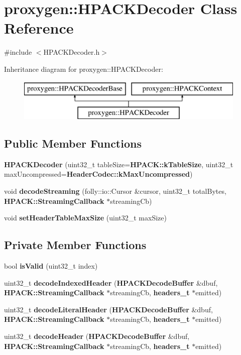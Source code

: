 \section{proxygen\+:\+:H\+P\+A\+C\+K\+Decoder Class Reference}
\label{classproxygen_1_1HPACKDecoder}


{\ttfamily \#include $<$H\+P\+A\+C\+K\+Decoder.\+h$>$}

Inheritance diagram for proxygen\+:\+:H\+P\+A\+C\+K\+Decoder\+:\begin{figure}[H]
\begin{center}
\leavevmode
\includegraphics[height=2.000000cm]{classproxygen_1_1HPACKDecoder}
\end{center}
\end{figure}
\subsection*{Public Member Functions}
\begin{DoxyCompactItemize}
\item 
{\bf H\+P\+A\+C\+K\+Decoder} (uint32\+\_\+t table\+Size={\bf H\+P\+A\+C\+K\+::k\+Table\+Size}, uint32\+\_\+t max\+Uncompressed={\bf Header\+Codec\+::k\+Max\+Uncompressed})
\item 
void {\bf decode\+Streaming} (folly\+::io\+::\+Cursor \&cursor, uint32\+\_\+t total\+Bytes, {\bf H\+P\+A\+C\+K\+::\+Streaming\+Callback} $\ast$streaming\+Cb)
\item 
void {\bf set\+Header\+Table\+Max\+Size} (uint32\+\_\+t max\+Size)
\end{DoxyCompactItemize}
\subsection*{Private Member Functions}
\begin{DoxyCompactItemize}
\item 
bool {\bf is\+Valid} (uint32\+\_\+t index)
\item 
uint32\+\_\+t {\bf decode\+Indexed\+Header} ({\bf H\+P\+A\+C\+K\+Decode\+Buffer} \&dbuf, {\bf H\+P\+A\+C\+K\+::\+Streaming\+Callback} $\ast$streaming\+Cb, {\bf headers\+\_\+t} $\ast$emitted)
\item 
uint32\+\_\+t {\bf decode\+Literal\+Header} ({\bf H\+P\+A\+C\+K\+Decode\+Buffer} \&dbuf, {\bf H\+P\+A\+C\+K\+::\+Streaming\+Callback} $\ast$streaming\+Cb, {\bf headers\+\_\+t} $\ast$emitted)
\item 
uint32\+\_\+t {\bf decode\+Header} ({\bf H\+P\+A\+C\+K\+Decode\+Buffer} \&dbuf, {\bf H\+P\+A\+C\+K\+::\+Streaming\+Callback} $\ast$streaming\+Cb, {\bf headers\+\_\+t} $\ast$emitted)
\end{DoxyCompactItemize}
